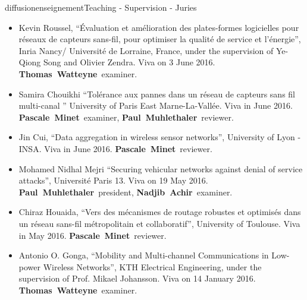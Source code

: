 \documentclass{ra2016}
\newcommand{\paul}             {\textbf{Paul~Muhlethaler}}
\newcommand{\pascale}          {\textbf{Pascale~Minet}}
\newcommand{\thomas}           {\textbf{Thomas~Watteyne}}
\newcommand{\achir}            {\textbf{Nadjib~Achir}}
\begin{document}
\begin{module}{diffusion}{enseignement}{Teaching - Supervision - Juries}
\begin{itemize}
\begin{itemize}
                Viva on 24 June 2016.
                \thomas~examiner.
            \item Kevin Roussel, ``\'Evaluation et am\'elioration des plates-formes logicielles pour r\'eseaux de capteurs sans-fil, pour optimiser la qualit\'e de service et l'\'energie'',  Inria Nancy/ Universit\'e de Lorraine, France, under the supervision of Ye-Qiong Song and Olivier Zendra.
                Viva on 3 June 2016.
                \thomas~examiner.
            \item Samira Chouikhi  ``Tolérance aux pannes dans un réseau de capteurs sans fil multi-canal '' University of Paris East Marne-La-Vall\'ee.
                Viva in June 2016.
                \pascale~examiner, \paul~reviewer.
            \item Jin Cui, ``Data aggregation in wireless sensor networks'', University of Lyon - INSA.
                Viva in June 2016.
                \pascale~reviewer.
            \item Mohamed Nidhal Mejri ``Securing vehicular networks against denial of service attacks'', Université Paris 13.
                Viva on 19 May 2016.
                \paul~president, \achir~examiner.
            \item Chiraz Houaida, ``Vers des m\'ecanismes de routage robustes et optimis\'es dans un r\'eseau sans-fil m\'etropolitain et collaboratif'', University of Toulouse.
                Viva in May 2016.
                \pascale~reviewer.
            \item Antonio O. Gonga, ``Mobility and Multi-channel Communications in Low-power Wireless Networks'', KTH Electrical Engineering,  under the supervision of Prof. Mikael Johansson.
                Viva on 14 January 2016.
                \thomas~examiner.
        \end{itemize}
\end{itemize}

\end{module}
\end{document}
